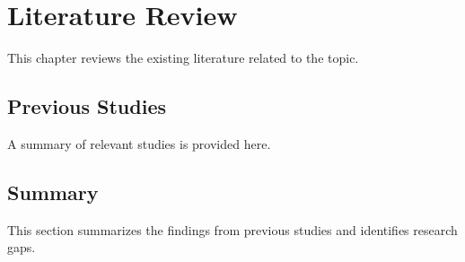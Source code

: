 \chapter{Literature Review}
This chapter reviews the existing literature related to the topic.

\section{Previous Studies}
A summary of relevant studies is provided here.

\section{Summary}
This section summarizes the findings from previous studies and identifies research gaps.
